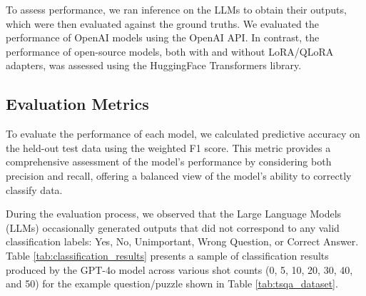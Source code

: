 \documentclass[conference]{IEEEtran}
\begin{document}
To assess performance, we ran inference on the LLMs to obtain their outputs, which were then evaluated against the ground truths. We evaluated the performance of OpenAI models using the OpenAI API.
In contrast, the performance of open-source models, both with and without LoRA/QLoRA adapters, was assessed using the HuggingFace Transformers library\cite{wolf2020transformers}.

\subsection{Evaluation Metrics}

To evaluate the performance of each model, we calculated predictive accuracy on the held-out test data using the weighted F1 score. This metric provides a comprehensive assessment of the model’s performance by considering both precision and recall, offering a balanced view of the model's ability to correctly classify data.

During the evaluation process, we observed that the Large Language Models (LLMs) occasionally generated outputs that did not correspond to any valid classification labels: Yes, No, Unimportant, Wrong Question, or Correct Answer. Table \ref{tab:classification_results} presents a sample of classification results produced by the GPT-4o model across various shot counts (0, 5, 10, 20, 30, 40, and 50) for the example question/puzzle shown in Table \ref{tab:tsqa_dataset}.
\end{document}
